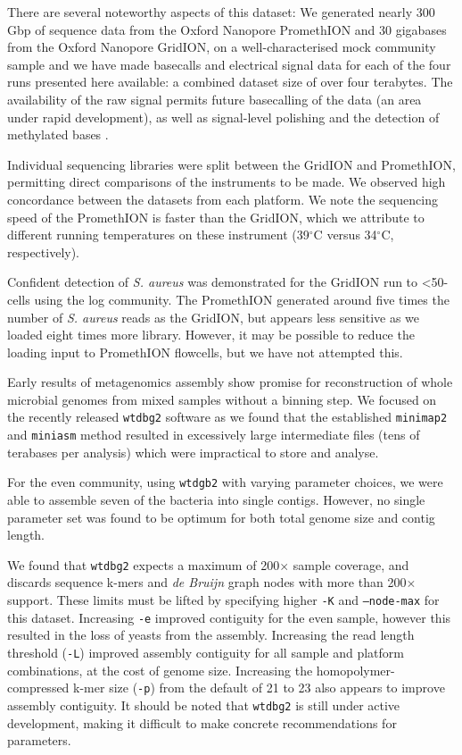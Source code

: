 \documentclass[a4paper,num-refs]{oup-contemporary}
\begin{document}
There are several noteworthy aspects of this dataset: We generated nearly 300 Gbp of sequence data from the Oxford Nanopore PromethION and 30 gigabases from the Oxford Nanopore GridION, on a well-characterised mock community sample and we have made basecalls and electrical signal data for each of the four runs presented here available: a combined dataset size of over four terabytes. The availability of the raw signal permits future basecalling of the data (an area under rapid development), as well as signal-level polishing and the detection of methylated bases \cite{Simpson2017-gn}.

Individual sequencing libraries were split between the GridION and PromethION, permitting direct comparisons of the instruments to be made. We observed high concordance between the datasets from each platform. We note the sequencing speed of the PromethION is faster than the GridION, which we attribute to different running temperatures on these instrument (39$^{\circ}$C versus 34$^{\circ}$C, respectively).

Confident detection of \textit{S. aureus} was demonstrated for the  GridION run to <50-cells using the log community. The PromethION generated around five times the number of \textit{S. aureus} reads as the GridION, but appears less sensitive as we loaded eight times more library. However, it may be possible to reduce the loading input to PromethION flowcells, but we have not attempted this.

Early results of metagenomics assembly show promise for reconstruction of whole microbial genomes from mixed samples without a binning step. We focused on the recently released \texttt{wtdbg2} software as we found that the established \texttt{minimap2} and \texttt{miniasm} method resulted in excessively large intermediate files (tens of terabases per analysis) which were impractical to store and analyse. 

For the even community, using \texttt{wtdgb2} with varying parameter choices, we were able to assemble seven of the bacteria into single contigs. However, no single parameter set was found to be optimum for both total genome size and contig length. 

We found that \texttt{wtdbg2} expects a maximum of 200$\times$ sample coverage, and discards sequence k-mers and \textit{de Bruijn} graph nodes with more than 200$\times$ support. These limits must be lifted by specifying higher \texttt{-K} and \texttt{--node-max} for this dataset. Increasing \texttt{-e} improved contiguity for the even sample, however this resulted in the loss of yeasts from the assembly. Increasing the read length threshold (\texttt{-L}) improved assembly contiguity for all sample and platform combinations, at the cost of genome size. Increasing the homopolymer-compressed k-mer size (\texttt{-p}) from the default of 21 to 23 also appears to improve assembly contiguity. It should be noted that \texttt{wtdbg2} is still under active development, making it difficult to make concrete recommendations for parameters.
\end{document}

